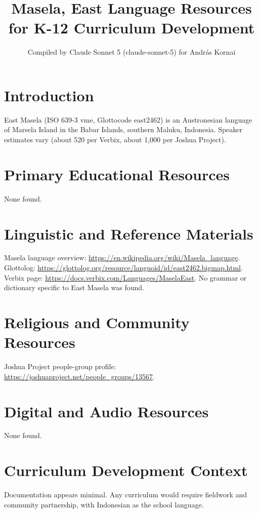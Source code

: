 \documentclass[12pt]{article}
\title{Masela, East Language Resources for K-12 Curriculum Development}
\author{Compiled by Claude Sonnet 5 (claude-sonnet-5) for Andr\'as Kornai}
\date{}
\begin{document}
\maketitle
\section{Introduction}
East Masela (ISO 639-3 vme, Glottocode east2462) is an Austronesian language of Marsela Island in the Babar Islands, southern Maluku, Indonesia. Speaker estimates vary (about 520 per Verbix, about 1,000 per Joshua Project).
\section{Primary Educational Resources}
None found.
\section{Linguistic and Reference Materials}
Masela language overview: \url{https://en.wikipedia.org/wiki/Masela_language}. Glottolog: \url{https://glottolog.org/resource/languoid/id/east2462.bigmap.html}. Verbix page: \url{https://docs.verbix.com/Languages/MaselaEast}. No grammar or dictionary specific to East Masela was found.
\section{Religious and Community Resources}
Joshua Project people-group profile: \url{https://joshuaproject.net/people_groups/13567}.
\section{Digital and Audio Resources}
None found.
\section{Curriculum Development Context}
Documentation appears minimal. Any curriculum would require fieldwork and community partnership, with Indonesian as the school language.
\end{document}
